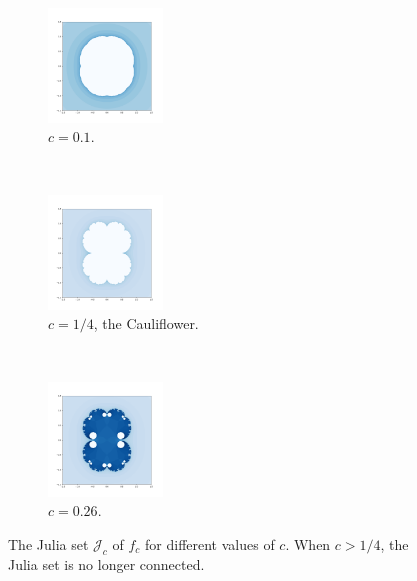 \begin{figure}[t!]
    \centering
    ~ 
    \begin{subfigure}[t]{0.3\textwidth}
        \centering
        \includegraphics[height=1.2in]{julia_01.png}
        \caption{$c=0.1$.}
    \end{subfigure}	
	~
    \begin{subfigure}[t]{0.2\textwidth}
        \centering
        \includegraphics[height=1.2in]{cauliflower.png}
        \caption{$c=1/4$, the Cauliflower.}
    \end{subfigure}%
    ~ 
    \begin{subfigure}[t]{0.3\textwidth}
        \centering
        \includegraphics[height=1.2in]{julia_026.png}
        \caption{$c=0.26$.}
    \end{subfigure}
    \caption{The Julia set $\mathcal J_c$ of $f_c$ for different values of $c$. When $c>1/4$, the Julia set is no longer connected.}
\end{figure}
